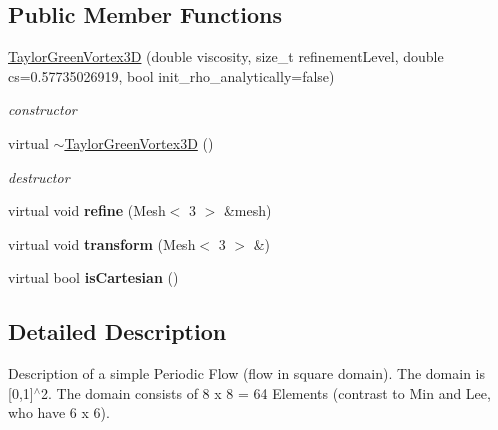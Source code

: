 \subsection*{Public Member Functions}
\begin{DoxyCompactItemize}
\item 
\hyperlink{classnatrium_1_1TaylorGreenVortex3D_a8d6071197520b6fb7766132318a15029}{TaylorGreenVortex3D} (double viscosity, size\_\-t refinementLevel, double cs=0.57735026919, bool init\_\-rho\_\-analytically=false)
\begin{DoxyCompactList}\small\item\em constructor \item\end{DoxyCompactList}\item 
\hypertarget{classnatrium_1_1TaylorGreenVortex3D_a1cc6d70f1b2610383f81b8d1109b6ae9}{
virtual \hyperlink{classnatrium_1_1TaylorGreenVortex3D_a1cc6d70f1b2610383f81b8d1109b6ae9}{$\sim$TaylorGreenVortex3D} ()}
\label{classnatrium_1_1TaylorGreenVortex3D_a1cc6d70f1b2610383f81b8d1109b6ae9}

\begin{DoxyCompactList}\small\item\em destructor \item\end{DoxyCompactList}\item 
\hypertarget{classnatrium_1_1TaylorGreenVortex3D_afb63a258bdd7bf1a34d021cac1d59d59}{
virtual void {\bfseries refine} (Mesh$<$ 3 $>$ \&mesh)}
\label{classnatrium_1_1TaylorGreenVortex3D_afb63a258bdd7bf1a34d021cac1d59d59}

\item 
\hypertarget{classnatrium_1_1TaylorGreenVortex3D_ade75fb96ea4f1281b4f8de927b09c757}{
virtual void {\bfseries transform} (Mesh$<$ 3 $>$ \&)}
\label{classnatrium_1_1TaylorGreenVortex3D_ade75fb96ea4f1281b4f8de927b09c757}

\item 
\hypertarget{classnatrium_1_1TaylorGreenVortex3D_a56c221da8ff8dce29f6d68dbd6266484}{
virtual bool {\bfseries isCartesian} ()}
\label{classnatrium_1_1TaylorGreenVortex3D_a56c221da8ff8dce29f6d68dbd6266484}

\end{DoxyCompactItemize}


\subsection{Detailed Description}
Description of a simple Periodic Flow (flow in square domain). The domain is \mbox{[}0,1\mbox{]}$^\wedge$2. The domain consists of 8 x 8 = 64 Elements (contrast to Min and Lee, who have 6 x 6). 

